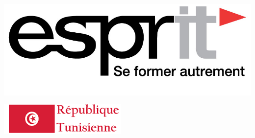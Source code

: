 


\thispagestyle{cover}%
\hspace{-47pt}
\begin{minipage}[l]{0.2\columnwidth}
\vspace{6mm}
\includegraphics[width=1.1\columnwidth]{img/Logo_ESPRIT_Ariana.jpg}\\
\end{minipage}
\hfill
\begin{minipage}[l]{0.6\columnwidth}
\centering
\footnotesize
\end{minipage}
\hfill
\begin{minipage}[l]{0.02\columnwidth}
\end{minipage}
\hfill
\begin{minipage}[l]{0.18\columnwidth}
\vspace{6mm}
\includegraphics[width=1.1\columnwidth]{img/tnlogo.PNG}\\
\end{minipage}
\vskip1.5cm


